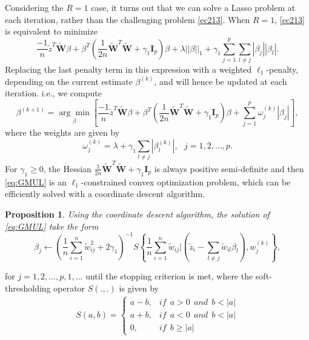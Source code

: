 \documentclass[a4paper,12pt,openany]{report}
\theoremstyle{plain}
\theoremstyle{plain}
\newtheorem{proposition}{\textbf{Proposition}}[section]
\theoremstyle{plain}
\theoremstyle{plain}
\theoremstyle{plain}
\theoremstyle{plain}
\theoremstyle{plain}
\theoremstyle{plain}
\theoremstyle{plain}
\theoremstyle{plain}
\theoremstyle{plain}
\theoremstyle{plain}
\begin{document}
Considering the $R=1$ case, it turns out that we can solve a Lasso problem at each iteration, rather than the challenging problem \eqref{ec213}. When $R=1$, \eqref{ec213} is equivalent to minimize
\begin{equation}
\frac{-1}{n}\tilde{z}^T\tilde{\mathbf{W}}\beta + \beta^T\left(\frac{1}{2n}\tilde{\mathbf{W}}^T\tilde{\mathbf{W}}+\gamma_1\mathbf{I}_p\right)\beta+\lambda||\beta||_1+\gamma_1\sum_{j=1}^{p}\sum_{l\neq j}|\beta_j||\beta_l|.
\end{equation}
Replacing the last penalty term in this expression with a weighted $\ell_1$-penalty, depending on the current estimate $\beta^{(k)}$, and will hence be updated at each iteration. i.e., we compute
\begin{equation}\label{eq:GMUL}
\beta^{(k+1)}=\underset{\beta}{\arg\min}\left[\frac{-1}{n}\tilde{z}^T\tilde{\mathbf{W}}\beta + \beta^T\left(\frac{1}{2n}\tilde{\mathbf{W}}^T\tilde{\mathbf{W}}+\gamma_1\mathbf{I}_p\right)\beta+\sum_{j=1}^{p}\omega_j^{(k)}|\beta_j|\right],
\end{equation}
where the weights are given by
\begin{equation}\label{eq:weight}
\omega_j^{(k)} = \lambda + \gamma_1\sum_{l\neq j}|\beta_l^{(k)}|, \ \ \ j=1,2,\ldots,p.
\end{equation}
For $\gamma_1\geq 0$, the Hessian $\frac{1}{2n}\tilde{\mathbf{W}}^T\tilde{\mathbf{W}}+\gamma_1\mathbf{I}_p$ is always positive semi-definite and then \eqref{eq:GMUL} is an $\ell_1$-constrained convex optimization problem, which can be efficiently solved with a coordinate descent algorithm.
\begin{proposition}
	Using the coordinate descent algorithm, the solution of \eqref{eq:GMUL} take the form
	\begin{equation}\label{eq:coordinatedescent}
	\beta_j\leftarrow\left(\frac{1}{n}\sum_{i=1}^{n}\tilde{w}_{ij}^2+2\gamma_1\right)^{-1}S\left\lbrace\frac{1}{n}\sum_{i=1}^{n}\tilde{w}_{ij}|\left(\tilde{z}_i-\sum_{l\neq j}\tilde{w}_{il}\beta_l\right), w_j^{(k)}\right\rbrace,
	\end{equation}
\end{proposition}
for $j=1,2,\ldots,p, 1,\ldots$ until the stopping criterion is met, where the soft-thresholding operator $S(.,.)$ is given by
\begin{eqnarray}
S(a,b) = \left\lbrace\begin{array}{ll}
a-b, & if \ \ a>0\ \ and\ \ b<|a|\\
a+b, & if \ \ a<0\ \ and\ \ b<|a|\\
0, & if \ \ b\geq |a|
\end{array}\right.
\end{eqnarray}
\end{document}
